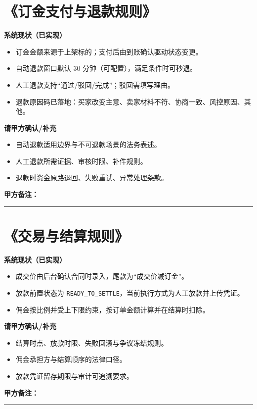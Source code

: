 \documentclass[12pt,a4paper]{ctexart}
\newcommand{\clientnote}{
\vspace{0.3em}
\noindent\textbf{甲方备注：}\par
\vspace{0.3em}
\noindent\rule{\textwidth}{0.4pt}\par
\vspace{1.0em}
}
\begin{document}
\section{《订金支付与退款规则》}
\textbf{系统现状（已实现）}
\begin{itemize}
  \item 订金金额来源于上架标的；支付后由到账确认驱动状态变更。
  \item 自动退款窗口默认 30 分钟（可配置），满足条件时可秒退。
  \item 人工退款支持“通过/驳回/完成”；驳回需填写理由。
  \item 退款原因码已落地：买家改变主意、卖家材料不符、协商一致、风控原因、其他。
\end{itemize}
\textbf{请甲方确认/补充}
\begin{itemize}
  \item 自动退款适用边界与不可退款场景的法务表述。
  \item 人工退款所需证据、审核时限、补件规则。
  \item 退款时资金原路退回、失败重试、异常处理条款。
\end{itemize}
\clientnote

\section{《交易与结算规则》}
\textbf{系统现状（已实现）}
\begin{itemize}
  \item 成交价由后台确认合同时录入，尾款为“成交价减订金”。
  \item 放款前置状态为 \texttt{READY\_TO\_SETTLE}，当前执行方式为人工放款并上传凭证。
  \item 佣金按比例并受上下限约束，按订单金额计算并在结算时扣除。
\end{itemize}
\textbf{请甲方确认/补充}
\begin{itemize}
  \item 结算时点、放款时限、失败回滚与争议冻结规则。
  \item 佣金承担方与结算顺序的法律口径。
  \item 放款凭证留存期限与审计可追溯要求。
\end{itemize}
\clientnote
\end{document}
